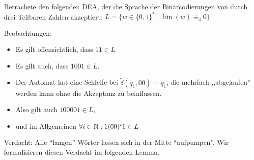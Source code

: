 \begin{Bsp*} Betrachete den folgenden \ac{DEA}, der die Sprache der Binärcodierungen von durch drei Teilbaren Zahlen akzeptiert:
                $L = \{ w\in \{0,1\}^* \mid \operatorname{bin}(w)\equiv_3 0\}$
    \begin{center}
  \end{center}
  Beobachtungen:
  \begin{itemize}
  \item Es gilt offensichtlich, dass $11 \in L$
  \item Es gilt auch, dass $1 \underline{0 0} 1 \in L$.
  \item Der Automat hat eine Schleife bei $\tilde\delta({q_1,00}) = q_1$, die mehrfach ,,abgelaufen'' werden kann ohne die Akzeptanz zu beinflussen.
  \item Also gilt auch $100001 \in L$,
  \item und im Allgemeinen $\forall i\in\mathbb{N}: 1(00)^i1 \in L$
  \end{itemize}
\end{Bsp*}
Verdacht: Alle ``langen'' Wörter lassen sich in der Mitte ``aufpumpen''.
Wir formalisieren diesen Verdacht im folgenden Lemma.

